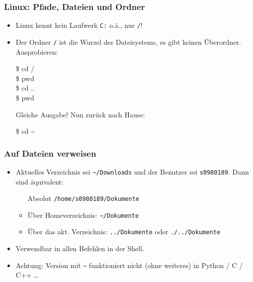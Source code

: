     \begin{frame}
        \frametitle{Linux: Pfade, Dateien und Ordner}
        \begin{itemize}
            \item Linux kennt kein Laufwerk \texttt{C:} o.ä., nur \texttt{/}!
            \item Der Ordner \texttt{/} ist die Wurzel des Dateisystems, es gibt
                keinen Überordner. Ausprobieren:
                \begin{tryit}
                    \$ cd / \\
                    \$ pwd \\
                    \$ cd .. \\
                    \$ pwd \\
                \end{tryit}
                \pause
                Gleiche Ausgabe! Nun zurück nach Hause:
                \begin{tryit}
                    \$ cd \textasciitilde
                \end{tryit}

        \end{itemize}
    \end{frame}

    \begin{frame}
        \frametitle{Auf Dateien verweisen}
        \begin{itemize}
            \item Aktuelles Verzeichnis sei \texttt{\textasciitilde/Downloads}
                und der Benutzer sei \texttt{s0980189}. Dann sind äquivalent:
                \begin{itemize}
                    \item[Absolut] \texttt{/home/s0980189/Dokumente}
                    \item Über Homeverzeichnis:
                        \texttt{\textasciitilde/Dokumente}
                    \item Über das akt. Verzeichnis: \texttt{../Dokumente} oder
                        \texttt{./../Dokumente}
                \end{itemize}
            \item Verwendbar in allen Befehlen in der Shell.
            \item \alert{Achtung: } Version mit \texttt{\textasciitilde}
                funktioniert nicht (ohne weiteres) in Python / C / C++ …
        \end{itemize}
    \end{frame}

